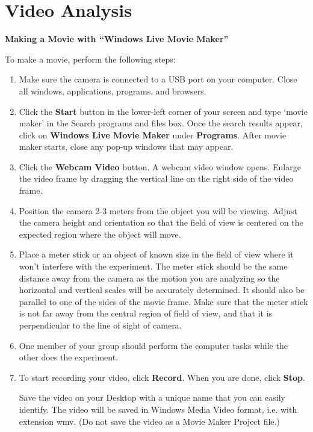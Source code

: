 
\section{Video Analysis}

\textbf{Making a Movie with ``Windows Live Movie Maker''} 

To make a movie, perform the following steps:

\begin{enumerate}

\item Make sure the camera is connected to a USB port on your computer. 
Close all windows, applications, programs, and browsers.

\item Click the {\bf Start} button in the lower-left corner of your screen and type `movie maker' in the Search programs and files box. 
Once the search results appear, click on {\bf Windows Live Movie Maker} under {\bf Programs}. 
After movie maker starts, close any pop-up windows that may appear.

\item Click the {\bf Webcam Video} button. 
A webcam video window opens. 
Enlarge the video frame by dragging the vertical line on the right side of the video frame.

\item Position the camera 2-3 meters from the object you will be viewing. 
Adjust the camera height and orientation so that the field of view is 
centered on the expected region where the object will move. 

\item Place a meter stick or an object of known size in the field of view where 
it won't interfere with the experiment. 
The meter stick should be the same distance away from the camera as the motion 
you are analyzing so the horizontal and vertical scales will be accurately determined. 
It should also be parallel to one of the sides of the movie frame. 
Make sure that the meter stick is not far away from the central region of field of view, and that it is perpendicular to the line of sight of camera.

\item One member of your group should perform the computer tasks while the other does the experiment.

\item To start recording your video, click {\bf Record}. When you are done, click {\bf Stop}. 

Save the video on your Desktop with a unique name that you can easily identify.
 The video will be saved in Windows Media Video format, i.e. with extension wmv. (Do not save the video as a Movie Maker Project file.)

\end{enumerate}


